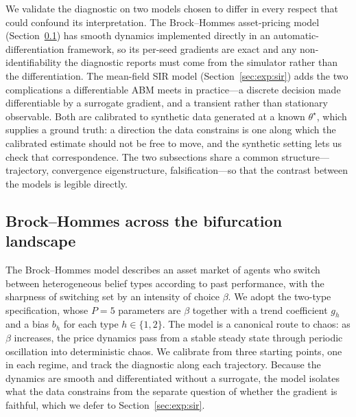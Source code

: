 \documentclass[10pt,twocolumn]{article}
\begin{document}
We validate the diagnostic on two models chosen to differ in every respect that
could confound its interpretation. The Brock--Hommes asset-pricing model
(Section~\ref{sec:exp:bh}) has smooth dynamics implemented directly in an
automatic-differentiation framework, so its per-seed gradients are exact and any
non-identifiability the diagnostic reports must come from the simulator rather than
the differentiation. The mean-field SIR model (Section~\ref{sec:exp:sir}) adds the
two complications a differentiable ABM meets in practice---a discrete decision made
differentiable by a surrogate gradient, and a transient rather than stationary
observable. Both are calibrated to synthetic data generated at a known
$\theta^\star$, which supplies a ground truth: a direction the data constrains is one
along which the calibrated estimate should not be free to move, and the synthetic
setting lets us check that correspondence. The two subsections share a common
structure---trajectory, convergence eigenstructure, falsification---so that the
contrast between the models is legible directly.

\subsection{Brock--Hommes across the bifurcation landscape}
\label{sec:exp:bh}

The Brock--Hommes model \citep{brock1998heterogeneous} describes an asset market of
agents who switch between heterogeneous belief types according to past performance,
with the sharpness of switching set by an intensity of choice $\beta$. We adopt the
two-type specification, whose $P=5$ parameters are $\beta$ together with a trend
coefficient $g_h$ and a bias $b_h$ for each type $h \in \{1,2\}$. The model is a
canonical route to chaos: as $\beta$ increases, the price dynamics pass from a stable
steady state through periodic oscillation into deterministic chaos. We calibrate from
three starting points, one in each regime, and track the diagnostic along each
trajectory. Because the dynamics are smooth and differentiated without a surrogate,
the model isolates what the data constrains from the separate question of whether the
gradient is faithful, which we defer to Section~\ref{sec:exp:sir}.
\end{document}
